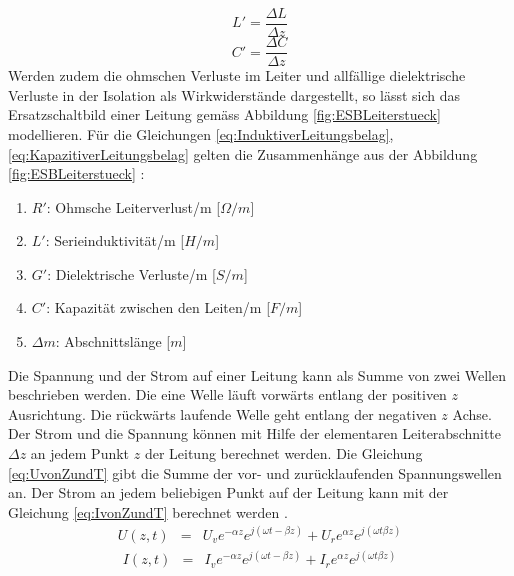 \begin{equation}
L'=\dfrac{\Delta L}{\Delta z}\label{eq:InduktiverLeitungsbelag}
\end{equation}
\begin{equation}
C'=\dfrac{\Delta C}{\Delta z}\label{eq:KapazitiverLeitungsbelag}
\end{equation}
Werden zudem die ohmschen Verluste im Leiter und allfällige dielektrische Verluste in der Isolation als Wirkwiderstände dargestellt, so lässt sich das Ersatzschaltbild einer Leitung gemäss Abbildung \ref{fig:ESBLeiterstueck} modellieren.
Für die Gleichungen \ref{eq:InduktiverLeitungsbelag}, \ref{eq:KapazitiverLeitungsbelag} gelten die Zusammenhänge aus der Abbildung \ref{fig:ESBLeiterstueck}  \cite{Tekom}:
\begin{enumerate}[leftmargin=2cm]
   \item[] $R'$: Ohmsche Leiterverlust/m [$\Omega/m$] 
   \item[] $L'$: Serieinduktivität/m  [$H/m$] 
   \item[] $G'$: Dielektrische Verluste/m  [$S/m$] 
   \item[] $C'$: Kapazität zwischen den Leiten/m  [$F/m$] 
   \item[] $\Delta m$: Abschnittslänge  [$m$] 
\end{enumerate} 
Die Spannung und der Strom auf einer Leitung kann als Summe von zwei Wellen beschrieben werden. Die eine Welle läuft vorwärts entlang der positiven $z$ Ausrichtung. Die rückwärts laufende Welle geht entlang der negativen $z$ Achse. Der Strom und die Spannung können mit Hilfe der elementaren Leiterabschnitte $\Delta z$ an jedem Punkt $z$  der Leitung berechnet werden. Die Gleichung \ref{eq:UvonZundT} gibt die Summe der vor- und zurücklaufenden Spannungswellen an. Der Strom an jedem beliebigen Punkt auf der Leitung kann mit der Gleichung \ref{eq:IvonZundT} berechnet werden \cite{Tekom}.
\begin{eqnarray}\label{eq:UvonZundT}
U(z,t) &=& U_{v}e^{-\alpha z}e^{j(\omega t -\beta z)}+U_{r}e^{\alpha z}e^{j(\omega t \beta z)}
\end{eqnarray}
\begin{eqnarray}\label{eq:IvonZundT}
I(z,t) &=& I_{v}e^{-\alpha z}e^{j(\omega t -\beta z)}+I_{r}e^{\alpha z}e^{j(\omega t \beta z)}
\end{eqnarray}

